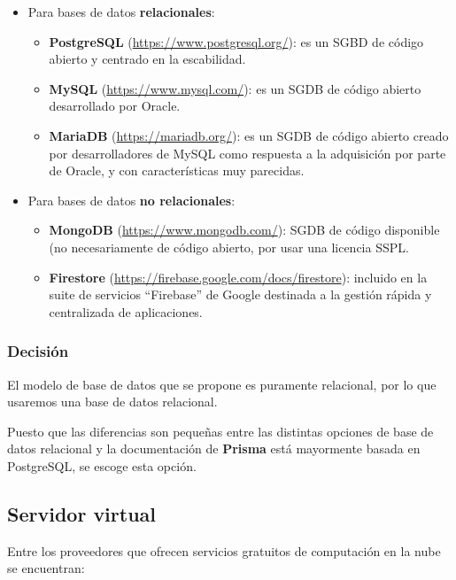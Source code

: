 \begin{itemize}
    \item Para bases de datos \textbf{relacionales}:
    \begin{itemize}
        \item \textbf{PostgreSQL} (\url{https://www.postgresql.org/}): es un SGBD de código abierto y centrado en la escabilidad.
        \item \textbf{MySQL} (\url{https://www.mysql.com/}): es un SGDB de código abierto desarrollado por Oracle.
        \item \textbf{MariaDB} (\url{https://mariadb.org/}): es un SGDB de código abierto creado por desarrolladores de MySQL como respuesta a la adquisición por parte de Oracle, y con características muy parecidas.
    \end{itemize}
    \item Para bases de datos \textbf{no relacionales}:
    \begin{itemize}
        \item \textbf{MongoDB} (\url{https://www.mongodb.com/}): SGDB de código disponible (no necesariamente de código abierto, por usar una licencia SSPL\cite{ssplLicense}.
        \item \textbf{Firestore} (\url{https://firebase.google.com/docs/firestore}): incluido en la suite de servicios ``Firebase'' de Google destinada a la gestión rápida y centralizada de aplicaciones.
    \end{itemize}
\end{itemize}

\subsubsection{Decisión}

El modelo de base de datos que se propone es puramente relacional, por lo que usaremos una base de datos relacional.

Puesto que las diferencias son pequeñas entre las distintas opciones de base de datos relacional y la documentación de \textbf{Prisma} está mayormente basada en PostgreSQL, se escoge esta opción.

\subsection{Servidor virtual}\label{subsection:elegirCloud}
Entre los proveedores que ofrecen servicios gratuitos de computación en la nube se encuentran:


